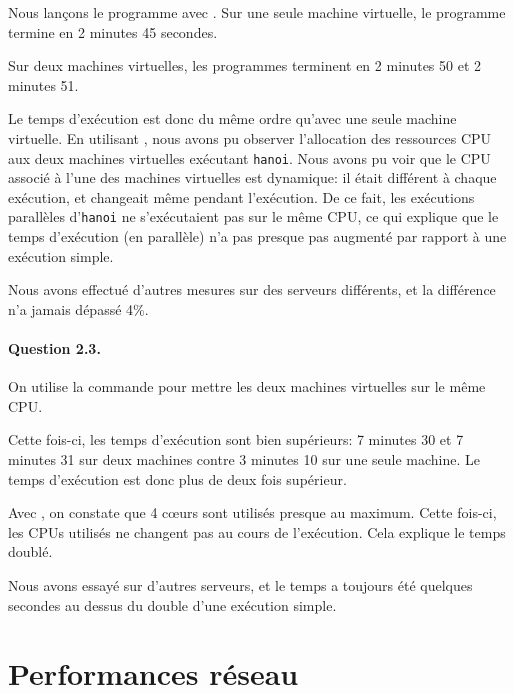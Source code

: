 \documentclass[12pt]{article}
\begin{document}
Nous lançons le programme  avec . Sur une seule machine virtuelle, le programme termine en 2 minutes 45 secondes.

Sur deux machines virtuelles, les programmes terminent en 2 minutes 50 et 2 minutes 51.


Le temps d'exécution est donc du même ordre qu'avec une seule machine virtuelle. En utilisant , nous avons pu observer l'allocation des ressources CPU aux deux machines virtuelles exécutant \texttt{hanoi}. Nous avons pu voir que le CPU associé à l'une des machines virtuelles est dynamique: il était différent à chaque exécution, et changeait même pendant l'exécution. De ce fait, les exécutions parallèles d'\texttt{hanoi} ne s'exécutaient pas sur le même CPU, ce qui explique que le temps d'exécution (en parallèle) n'a pas presque pas augmenté par rapport à une exécution simple.

Nous avons effectué d'autres mesures sur des serveurs différents, et la différence n'a jamais dépassé 4\%.


\paragraph{Question 2.3.}
On utilise la commande  pour mettre les deux machines virtuelles sur le même CPU.



Cette fois-ci, les temps d'exécution sont bien supérieurs: 7 minutes 30 et 7 minutes 31 sur deux machines contre 3 minutes 10 sur une seule machine. Le temps d'exécution est donc plus de deux fois supérieur.

Avec , on constate que 4 c\oe urs sont utilisés presque au maximum. Cette fois-ci, les CPUs utilisés ne changent pas au cours de l'exécution. Cela explique le temps doublé.

Nous avons essayé sur d'autres serveurs, et le temps a toujours été quelques secondes au dessus du double d'une exécution simple.


\section{Performances réseau}
\end{document}
